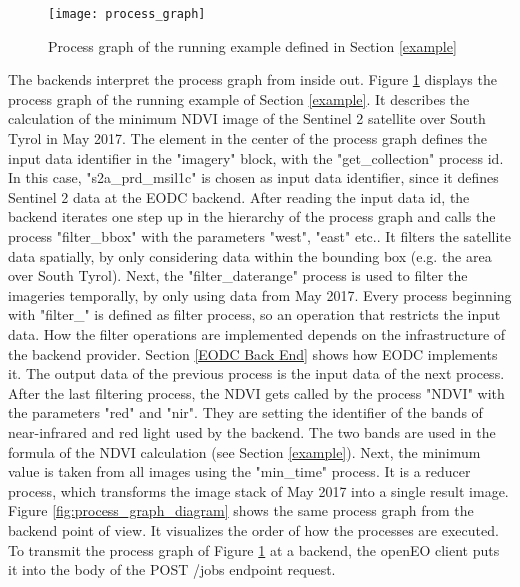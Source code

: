 \documentclass[draft,final]{vutinfth} %
\newcommand{\bgoesswein}[1]{{\color{blue}#1}}
\begin{document}
\begin{figure}[h]
	\centering
	\texttt{[image: process\_graph]}
	\caption{Process graph of the running example defined in Section \ref{example}}
	\label{fig:process_graph} %
\end{figure}


The backends interpret the process graph from inside out. Figure \ref{fig:process_graph} displays the process graph of the running example of Section \ref{example}. It describes the calculation of the minimum NDVI image of the Sentinel 2 satellite over South Tyrol in May 2017. The element in the center of the process graph defines the input data identifier in the "imagery" block, with the "get\_collection" process id. In this case, "s2a\_prd\_msil1c" is chosen as input data identifier, since it defines Sentinel 2 data at the EODC backend.
After reading the input data id, the backend iterates one step up in the hierarchy of the process graph and calls the process "filter\_bbox" with the parameters "west", "east" etc.. It filters the satellite data spatially, by only considering data within the bounding box (e.g. the area over South Tyrol). Next, the "filter\_daterange" process is used to filter the imageries temporally, by only using data from May 2017. Every process beginning with "filter\_" is defined as filter process, so an operation that restricts the input data. 
\bgoesswein{How the filter operations are implemented depends on the infrastructure of the backend provider. Section \ref{EODC Back End} shows how EODC implements it.}
The output data of the previous process is the input data of the next process. After the last filtering process, the NDVI gets called by the process "NDVI" with the parameters "red" and "nir". They are setting the identifier of the bands of near-infrared and red light used by the backend. The two bands are used in the formula of the NDVI calculation (see Section \ref{example}). Next, the minimum value is taken from all images using the "min\_time" process. It is a reducer process, which transforms the image stack of May 2017 into a single result image. Figure \ref{fig:process_graph_diagram} shows the same process graph from the backend point of view. It visualizes the order of how the processes are executed. To transmit the process graph of Figure \ref{fig:process_graph} at a backend, the openEO client puts it into the body of the POST /jobs endpoint request.
\end{document}
